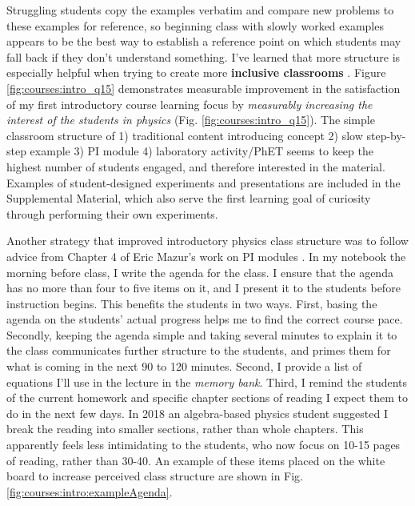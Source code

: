 \documentclass[../../main.tex]{subfiles}
\begin{document}
Struggling students copy the examples verbatim and compare new problems to these examples for reference, so beginning class with slowly worked examples appears to be the best way to establish a reference point on which students may fall back if they don't understand something.  I've learned that more structure is especially helpful when trying to create more \textbf{inclusive classrooms} \cite{inclusive}. Figure \ref{fig:courses:intro_q15} demonstrates measurable improvement in the satisfaction of my first introductory course learning focus by \textit{measurably increasing the interest of the students in physics} (Fig. \ref{fig:courses:intro_q15}).  The simple classroom structure of 1) traditional content introducing concept 2) slow step-by-step example 3) PI module 4) laboratory activity/PhET seems to keep the highest number of students engaged, and therefore interested in the material. Examples of student-designed experiments and presentations are included in the Supplemental Material, which also serve the first learning goal of curiosity through performing their own experiments.\\ \hspace{0.1cm}

Another strategy that improved introductory physics class structure was to follow advice from Chapter 4 of Eric Mazur's work on PI modules \cite{mazur}.  In my notebook the morning before class, I write the agenda for the class.  I ensure that the agenda has no more than four to five items on it, and I present it to the students before instruction begins.  This benefits the students in two ways.  First, basing the agenda on the students' actual progress helps me to find the correct course pace.  Secondly, keeping the agenda simple and taking several minutes to explain it to the class communicates further structure to the students, and primes them for what is coming in the next 90 to 120 minutes.  Second, I provide a list of equations I'll use in the lecture in the \textit{memory bank}.  Third, I remind the students of the current homework and specific chapter sections of reading I expect them to do in the next few days.  In 2018 an algebra-based physics student suggested I break the reading into smaller sections, rather than whole chapters.  This apparently feels less intimidating to the students, who now focus on 10-15 pages of reading, rather than 30-40.  An example of these items placed on the white board to increase perceived class structure are shown in Fig. \ref{fig:courses:intro:exampleAgenda}. \\ \hspace{0.1cm}
\end{document}
